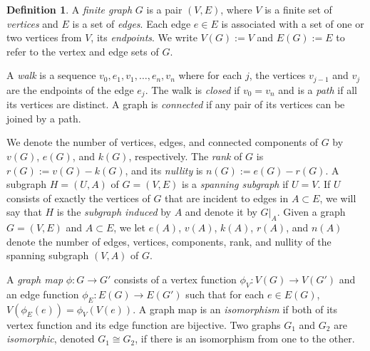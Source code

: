 \documentclass[pdflatex,sn-mathphys-num]{sn-jnl}%
\theoremstyle{plain}
\theoremstyle{definition}
\newtheorem{definition}[theorem]{Definition}
\theoremstyle{remark}
\begin{document}
\begin{definition}
    A \emph{finite graph} $G$ is a pair $(V, E)$, where $V$ is a finite set of \emph{vertices} and $E$ is a set of \emph{edges}. Each edge $e \in E$ is associated with a set of one or two vertices from $V$, its \emph{endpoints}. We write $V(G):=V$ and $E(G):=E$ to refer to the vertex and edge sets of $G$. 
    
    A \emph{walk} is a sequence $v_0, e_1, v_1, \dots, e_n, v_n$ where for each $j$, the vertices $v_{j-1}$ and $v_j$ are the endpoints of the edge $e_j$. The walk is \emph{closed} if $v_0 = v_n$ and is a \emph{path} if all its vertices are distinct. A graph is \emph{connected} if any pair of its vertices can be joined by a path.
    
    We denote the number of vertices, edges, and connected components of $G$ by $v(G)$, $e(G)$, and $k(G)$, respectively. The \emph{rank} of $G$ is $r(G) := v(G) - k(G)$, and its \emph{nullity} is $n(G) := e(G) - r(G)$. {A subgraph $H=(U,A)$ of $G=(V,E)$ is a \emph{spanning subgraph} if $U=V$. If $U$ consists of exactly the vertices of $G$ that are incident to edges in $A\subset E$, we will say that $H$ is the \emph{subgraph induced} by $A$ and denote it by $G|_A$. Given a graph $G=(V,E)$ and $A\subset E$, we let $e(A)$, $v(A)$, $k(A)$, $r(A)$, and $n(A)$ denote the number of edges, vertices, components, rank, and nullity of the spanning subgraph $(V,A)$ of $G$.} 

    {A \emph{graph map} $\phi:G\to G'$ consists of a vertex function $\phi_V: V(G) \to V({G'})$ and an edge function $\phi_E: E(G)\to E(G')$ such that for each $e \in E(G)$, $V(\phi_E(e))= \phi_V(V(e))$. A graph map is an \emph{isomorphism} if both of its vertex function and its edge function are bijective. Two graphs $G_1$ and $G_2$ are \emph{isomorphic}, denoted $G_1 \cong G_2$, if there is an isomorphism from one to the other.}
\end{definition}
\end{document}
